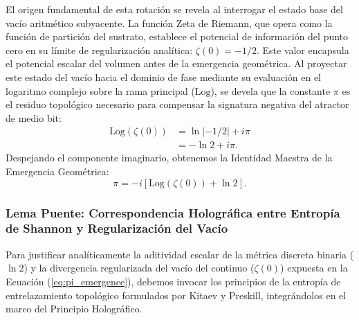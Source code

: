\documentclass[12pt,a4paper]{article}
\theoremstyle{plain}
\theoremstyle{definition}
\theoremstyle{remark}
\begin{document}
El origen fundamental de esta rotación se revela al interrogar el estado base del vacío aritmético subyacente. La función Zeta de Riemann, que opera como la función de partición del sustrato, establece el potencial de información del punto cero en su límite de regularización analítica: $\zeta(0) = -1/2$. Este valor encapsula el potencial escalar del volumen antes de la emergencia geométrica. Al proyectar este estado del vacío hacia el dominio de fase mediante su evaluación en el logaritmo complejo sobre la rama principal ($\text{Log}$), se devela que la constante $\pi$ es el residuo topológico necesario para compensar la signatura negativa del atractor de medio bit:
\begin{align}
    \text{Log}(\zeta(0)) &= \ln|-1/2| + i\pi \nonumber \\
    &= -\ln 2 + i\pi.
\end{align}
Despejando el componente imaginario, obtenemos la Identidad Maestra de la Emergencia Geométrica:
\begin{equation}
    \pi = -i \left[ \text{Log}(\zeta(0)) + \ln 2 \right].
    \label{eq:pi_emergence}
\end{equation}

\subsubsection*{Lema Puente: Correspondencia Holográfica entre Entropía de Shannon y Regularización del Vacío}
\label{subsubsec:lema_puente}

Para justificar analíticamente la aditividad escalar de la métrica discreta binaria ($\ln 2$) y la divergencia regularizada del vacío del continuo ($\zeta(0)$) expuesta en la Ecuación (\ref{eq:pi_emergence}), debemos invocar los principios de la entropía de entrelazamiento topológico formulados por Kitaev y Preskill, integrándolos en el marco del Principio Holográfico.
\end{document}
